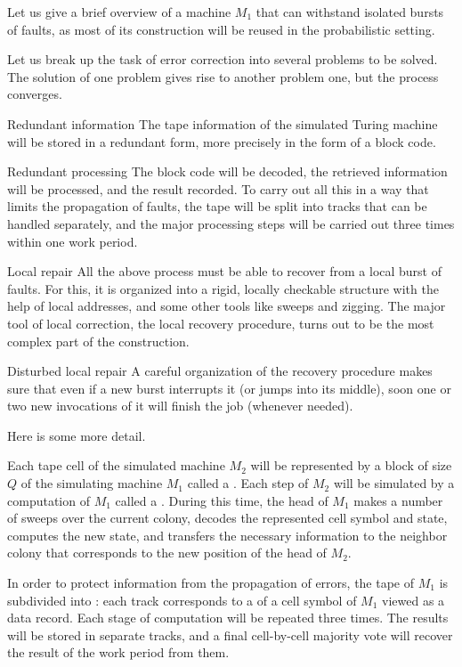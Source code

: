 \documentclass[12pt]{memoir}
\begin{document}
Let us give a brief overview of a machine \( M_1 \) that
can withstand isolated bursts of faults, as most of its construction will be reused
in the probabilistic setting.

Let us break up the task of error correction into several 
problems to be solved.
The solution of one problem gives rise to another problem one, 
but the process converges.
\begin{flushdescription}
\item[Redundant information] The tape information of the simulated Turing machine
will be stored in a redundant form, more precisely in the form of a block code.
\item[Redundant processing] The block code will be decoded, the retrieved information 
will be processed, and the result recorded.
To carry out all this in a way that limits the propagation of faults, the tape will be split
into tracks that can be handled separately, and the major processing steps will be 
carried out three times within one work period.
\item[Local repair] All the above process must be able to recover from a local burst of faults.
For this, it is organized into a rigid, locally checkable structure
with the help of local addresses, and some other tools like sweeps and 
zigging.
The major tool of local correction, the local recovery procedure, turns out to be the most
complex part of the construction.
\item[Disturbed local repair] A careful organization of the recovery procedure
makes sure that even if a new burst interrupts it (or jumps into its middle),
soon one or two new invocations of it will finish the job (whenever needed).
\end{flushdescription}

Here is some more detail.

Each tape cell of the simulated machine \( M_{2} \) will be represented by a block of
size \( Q \) of the simulating machine \( M_{1} \) called a .
Each step of \( M_{2} \) will be simulated by a computation of \( M_{1} \) called
a .
During this time, the head of \( M_{1} \) makes a number of sweeps over the
current colony, decodes the represented cell symbol and state,
computes the new state, and transfers the necessary information to the 
neighbor colony that corresponds to the new position of the head of \( M_{2} \).

In order to protect information from the propagation of errors,
the tape of \( M_{1} \) is subdivided into : each track corresponds to a 
 of a cell symbol of \( M_{1} \) viewed as a data record.
Each stage of computation will be repeated three times.
The results will be stored in separate tracks, and a final cell-by-cell majority vote
will recover the result of the work period from them.
\end{document}
